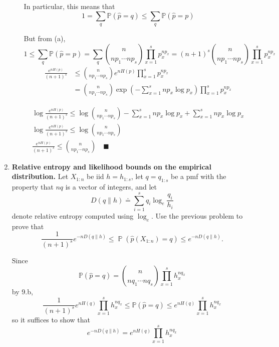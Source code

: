 \documentclass[12pt]{article}
\renewcommand{\hat}[1]{\widehat{#1}}
\renewcommand{\P}{\mathbb{P}}
\newcommand{\qed}{\quad \blacksquare}
\DeclareMathOperator{\Prob}{\mathbb{P}}
\begin{document}
\begin{enumerate}[1.]
\begin{enumerate}
		            In particular, this means that
		            \[1 = \sum_q \P(\hat p = q) \leq \sum_q \P(\hat p = p)\]

		            But from (a),
		            \[1  \leq \sum_q \P(\hat p = p) = \sum_q \binom{n}{np_1 \cdots np_s} \prod_{x=1}^s p_x^{np_x} = (n+1)^s \binom{n}{np_1 \cdots np_s} \prod_{x=1}^s p_x^{np_x}\]
		            \begin{align*}
			            \frac{e^{nH(p)}}{(n+1)^s} & \leq \binom{n}{np_1 \cdots np_s} e^{nH(p)}\prod_{x=1}^s p_x^{np_x}                                 \\
			                                      & = \binom{n}{np_1 \cdots np_s} \exp\left(-\sum_{x=1}^s np_x \log p_x\right)\prod_{x=1}^s p_x^{np_x}
		            \end{align*}

		            \begin{gather*}
			            \log \frac{e^{nH(p)}}{(n+1)^s} \leq \log \binom{n}{np_1 \cdots np_s} - \sum_{x=1}^s np_x \log p_x + \sum_{x=1}^s np_x \log p_x    \\
			            \log \frac{e^{nH(p)}}{(n+1)^s} \leq \log \binom{n}{np_1 \cdots np_s}                                                              \\
			            \frac{e^{nH(p)}}{(n+1)^s}     \leq  \binom{n}{np_1 \cdots np_s} \qed
		            \end{gather*}
		            \color{black}

	      \end{enumerate}

	      \pagebreak

	\item {\bf Relative entropy and likelihood bounds on the empirical distribution.}
	      Let $X_{1:n}$ be iid $h=h_{1:s}$, let $q=q_{1:s}$ be a pmf with the property that $nq$ is a vector of integers, and let
	      \[
		      D(q\|h) \doteq \sum_{i=1}^s q_i \log_e \frac{q_i}{h_i}
	      \]
	      denote relative entropy computed using $\log_e$.
	      Use the previous problem to prove that
	      \[ \frac{1}{(n+1)^s} e^{-nD(q\|h)} \leq \Prob(\widehat p(X_{1:n}) = q) \leq e^{-nD(q\|h)} . \]

	      \color{blue}
	      Since
	      \[\P(\hat p = q)  = \binom{n}{nq_1 \cdots nq_s} \prod_{x=1}^s h_x^{nq_x} \]
	      by 9.b,
	      \[\frac{1}{(n+1)^s} e^{nH(q)} \prod_{x=1}^s h_x^{nq_x} \leq \P(\hat p =q) \leq e^{nH(q)} \prod_{x=1}^s h_x^{nq_x} \]
	      so it suffices to show that
	      \[e^{-nD(q \| h)} = e^{nH(q)} \prod_{x=1}^s h_x^{nq_x}\]


\end{enumerate}
\end{document}
